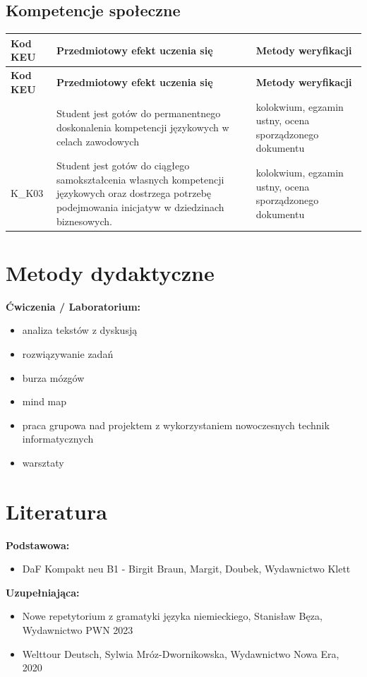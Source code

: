 \documentclass[12pt, a4paper]{article}
\newcommand{\thdrule}{\noalign{\global\setlength{\extrarowheight}{0pt}}}
\newcommand{\thdend}{\noalign{\global\setlength{\extrarowheight}{3pt}}}
\begin{document}
\subsection*{Kompetencje społeczne}
{\scriptsize
\begin{longtable}{m{1.6cm}m{9.0cm}m{4.2cm}}
\thdrule\toprule
\rowcolor{pjatkRed} {\color{white}\footnotesize\textbf{\vphantom{Ag}Kod KEU}} & {\color{white}\footnotesize\textbf{\vphantom{Ag}Przedmiotowy efekt uczenia się}} & {\color{white}\footnotesize\textbf{\vphantom{Ag}Metody weryfikacji}} \\
\midrule\thdend
\endfirsthead
\thdrule\toprule
\rowcolor{pjatkRed} {\color{white}\footnotesize\textbf{\vphantom{Ag}Kod KEU}} & {\color{white}\footnotesize\textbf{\vphantom{Ag}Przedmiotowy efekt uczenia się}} & {\color{white}\footnotesize\textbf{\vphantom{Ag}Metody weryfikacji}} \\
\midrule\thdend
\endhead
  \rowcolor{tableRowLight}  & Student jest gotów do permanentnego doskonalenia kompetencji językowych w celach zawodowych & kolokwium, egzamin ustny, ocena sporządzonego dokumentu \\
  \rowcolor{tableRowAlt} K\_K03 & Student jest gotów do ciągłego samokształcenia własnych kompetencji językowych oraz dostrzega potrzebę podejmowania inicjatyw w dziedzinach biznesowych. & kolokwium, egzamin ustny, ocena sporządzonego dokumentu \\
\bottomrule
\end{longtable}}

\section{Metody dydaktyczne}

\textbf{Ćwiczenia / Laboratorium:}
\begin{itemize}
  \item analiza tekstów z dyskusją
  \item rozwiązywanie zadań
  \item burza mózgów
  \item mind map
  \item praca grupowa nad projektem z wykorzystaniem nowoczesnych technik informatycznych
  \item warsztaty
\end{itemize}
\vspace{4pt}


\section{Literatura}

\textbf{Podstawowa:}
\begin{itemize}
  \item DaF Kompakt neu B1 - Birgit Braun, Margit, Doubek, Wydawnictwo Klett
\end{itemize}

\textbf{Uzupełniająca:}
\begin{itemize}
  \item Nowe repetytorium z gramatyki języka niemieckiego, Stanisław Bęza, Wydawnictwo PWN 2023
  \item Welttour Deutsch, Sylwia Mróz-Dwornikowska, Wydawnictwo Nowa Era, 2020
\end{itemize}
\end{document}
